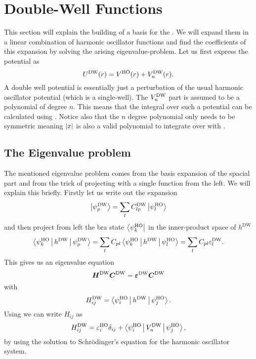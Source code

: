 \section{Double-Well Functions\label{sec:dwfunc}}
    This section will explain the building of a basis for the
    . We will expand them in a linear combination
    of harmonic oscillator functions and find the coefficients of this expansion
    by solving the arising eigenvalue-problem. Let us first express the
    potential as
        \begin{equation}
            U^{\text{DW}}(r) = V^{\text{HO}}(r) + V^{\text{DW}}_n(r).
            \label{eq:UDW}
        \end{equation}
    A double well potential is essentially just a perturbation of the usual
    harmonic oscillator potential (which is a single-well). The $V^{\text{DW}}_n$ part is
    assumed to be a polynomial of  degree $n$. This means that the
    integral over such a potential can be calculated using
    . Notice also that the $n$ degree polynomial only needs
    to be symmetric meaning $\abs{x}$ is also a valid polynomial to integrate
    over with .

\subsection{The Eigenvalue problem}
    The mentioned eigenvalue problem comes from the basis expansion of the
    spacial part and from the trick of projecting with a single function from
    the left. We will explain this briefly. Firstly let us write out the
    expansion
        \begin{equation}
            \ket{\psi^{\text{DW}}_p} = \sum\limits_{l}C^{\text{DW}}_{lp}\ket{\psi^{\text{HO}}_l}
            \label{eq:dwexpansiondef}
        \end{equation}
    and then project from left the bra state $\bra{\psi^{\text{HO}}_k}$ in the
    inner-product space of $h^{\text{DW}}$
        \begin{equation}
            \Braket{\psi^{\text{HO}}_k|h^{\text{DW}}|\psi^{\text{DW}}_p} =
            \sum\limits_{l}C_{pl}\Braket{\psi^{\text{HO}}_k|h^{\text{DW}}|\psi^{\text{HO}}_l} =
            \sum\limits_{l}C_{pl}\varepsilon^{\text{DW}}_l.
        \end{equation}
    This gives us an eigenvalue equation
        \begin{equation}
            \boldsymbol{{H}}^{\text{DW}}\boldsymbol{{C}}^{\text{DW}} =
            \boldsymbol{{\varepsilon^{\text{DW}}}}\boldsymbol{{C}}^{\text{DW}}
        \end{equation}
    with
        \begin{equation}
            H^{\text{DW}}_{ij} = \Braket{\psi^{\text{HO}}_i|h^{\text{DW}}|\psi^{\text{HO}}_j}.
        \end{equation}
    Using  we can write $H_{ij}$ as
        \begin{equation}
            H^{\text{DW}}_{ij} = \varepsilon^{\text{HO}}_i\delta_{ij} +
            \Braket{\psi^{\text{HO}}_i|V^{\text{DW}}_n|\psi^{\text{HO}}_j},
            \label{eq:Heigdef}
        \end{equation}
    by using the solution to Schrödinger's equation for the harmonic oscillator
    system.


